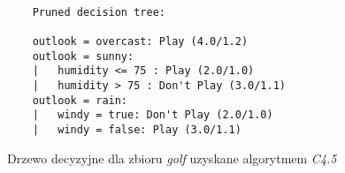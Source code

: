 \begin{figure}
	\begin{verbatim}
	
	Pruned decision tree:
	
	outlook = overcast: Play (4.0/1.2)
	outlook = sunny:
	|   humidity <= 75 : Play (2.0/1.0)
	|   humidity > 75 : Don't Play (3.0/1.1)
	outlook = rain:
	|   windy = true: Don't Play (2.0/1.0)
	|   windy = false: Play (3.0/1.1)

	\end{verbatim}
	
	\caption{Drzewo decyzyjne dla zbioru \emph{golf} uzyskane algorytmem \emph{C4.5}}

	\label{p2t1-tree}

\end{figure}

